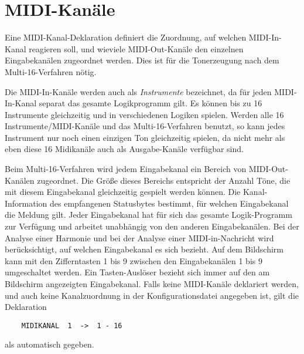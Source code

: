 \chapter{MIDI-Kanäle}\label{cha:midi-kanale}
\label{MIDIKANAL}

Eine MIDI-Kanal-Deklaration definiert die Zuordnung, auf welchen
MIDI-In-Kanal \mutabor{} reagieren soll, und wieviele MIDI-Out-Kanäle
den einzelnen Eingabekanälen zugeordnet werden. Dies ist für die
Tonerzeugung nach dem Multi-16-Verfahren
 nötig. 
\iffalse
Wird als
Synthesizer-Treiber das Modell FB-01\index{FB-01} eingestellt, so gilt nur
die Angabe des MIDI-In-Kanals, der Ausgabekanal wird ignoriert.
\fi
Die MIDI-In-Kanäle werden auch als \emph{Instrumente} bezeichnet, da
für jeden MIDI-In-Kanal separat das gesamte Logikprogramm gilt.
Es können bis zu 16 Instrumente gleichzeitig und in
verschiedenen Logiken spielen.
Werden alle 16 Instrumente/MIDI-Kanäle
und das Multi-16-Verfahren benutzt, so kann jedes Instrument nur
noch einen einzigen
Ton gleichzeitig spielen, da nicht mehr als eben diese 16 Midikanäle
auch als Ausgabe-Kanäle verfügbar sind. 
\iffalse
Beim Modell FB-01 von Yamaha wird
eine spezielle System-exklusive Ansteuerungsmethode verwendet,
so daß hier bis zu 16 Instrumente zu je 16 gleichzeitigen Tönen
spielbar sind.
\fi

Beim Multi-16-Verfahren wird
jedem Eingabekanal ein Bereich von MIDI-Out-Kanälen zugeordnet. Die Größe
dieses Bereichs entspricht der Anzahl Töne,
die mit diesem Eingabekanal gleichzeitig gespielt werden können.
Die Kanal-Information des empfangenen Statusbytes bestimmt, für
welchen Eingabekanal die Meldung gilt.
Jeder Eingabekanal hat für sich das gesamte Logik-Programm
zur Verfügung und arbeitet unabhängig von den anderen Eingabekanälen.
Bei der Analyse einer Harmonie und bei der Analyse einer MIDI-in-Nachricht
wird berücksichtigt, auf welchen Eingabekanal es sich bezieht.
Auf dem Bildschirm kann mit den Zifferntasten 1 bis 9 zwischen den
Eingabekanälen 1 bis 9 umgeschaltet werden. Ein Tasten-Auslöser
bezieht sich immer auf den am Bildschirm angezeigten Eingabekanal.
Falls keine MIDI-Kanäle deklariert werden, und auch keine Kanalzuordnung
in der Konfigurationsdatei angegeben ist,
gilt die Deklaration
\begin{lstlisting}
	MIDIKANAL  1  ->  1 - 16
\end{lstlisting}
als automatisch gegeben.



